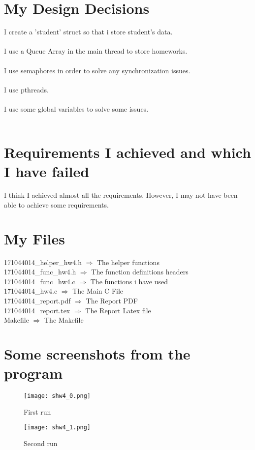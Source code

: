 \documentclass[20pt]{article}
\begin{document}
\section{My Design Decisions}
I create a 'student' struct so that i store student's data.
\\\\
I use a Queue Array in the main thread to store homeworks.
\\\\
I use semaphores in order to solve any synchronization issues.
\\\\
I use pthreads.
\\\\
I use some global variables to solve some issues.
\\\\
\section{Requirements I achieved and which I have failed}
I think I achieved almost all the requirements. However, I may not have been able to achieve some requirements.
\\
\section{My Files}
171044014\_helper\_hw4.h $\Rightarrow$ The helper functions \\
171044014\_func\_hw4.h $\Rightarrow$ The function definitions headers \\
171044014\_func\_hw4.c $\Rightarrow$ The functions i have used \\
171044014\_hw4.c $\Rightarrow$ The Main C File \\
171044014\_report.pdf $\Rightarrow$ The Report PDF \\
171044014\_report.tex $\Rightarrow$ The Report Latex file \\
Makefile $\Rightarrow$ The Makefile \\

\section{Some screenshots from the program}
\begin{figure}[h!]
  \texttt{[image: shw4\_0.png]}
  \caption{First run}
  \label{fig:code}
\end{figure}

\begin{figure}[h!]
  \texttt{[image: shw4\_1.png]}
  \caption{Second run}
  \label{fig:code}
\end{figure}
\end{document}
